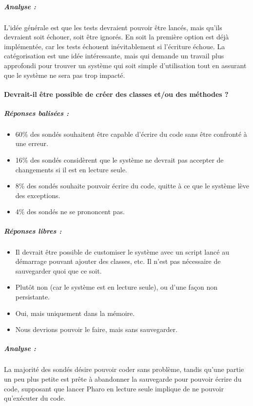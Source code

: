 \subparagraph{Analyse :}
L'idée générale est que les tests devraient pouvoir être lancés, mais qu'ils devraient soit échouer, soit être ignorés. En soit la première option est déjà implémentée, car les tests échouent inévitablement si l'écriture échoue. La catégorisation est une idée intéressante, mais qui demande un travail plus approfondi pour trouver un système qui soit simple d'utilisation tout en assurant que le système ne sera pas trop impacté.

\paragraph{Devrait-il être possible de créer des classes et/ou des méthodes ?}
\subparagraph{Réponses balisées :}
\begin{itemize}
	\item 60\% des sondés souhaitent être capable d'écrire du code sans être confronté à une erreur.
	\item 16\% des sondés considèrent que le système ne devrait pas accepter de changements si il est en lecture seule.
	\item 8\% des sondés souhaite pouvoir écrire du code, quitte à ce que le système lève des exceptions.
	\item 4\% des sondés ne se prononcent pas.
\end{itemize}

\subparagraph{Réponses libres :}
\begin{itemize}
	\item Il devrait être possible de customiser le système avec un script lancé au démarrage pouvant ajouter des classes, etc. Il n'est pas nécessaire de sauvegarder quoi que ce soit.
	\item Plutôt non (car le système est en lecture seule), ou d'une façon non persistante.
	\item Oui, mais uniquement dans la mémoire.
	\item Nous devrions pouvoir le faire, mais sans sauvegarder.
\end{itemize}

\subparagraph{Analyse :}
La majorité des sondés désire pouvoir coder sans problème, tandis qu'une partie un peu plus petite est prête à abandonner la sauvegarde pour pouvoir écrire du code, supposant que lancer Pharo en lecture seule implique de ne pouvoir qu'exécuter du code.

